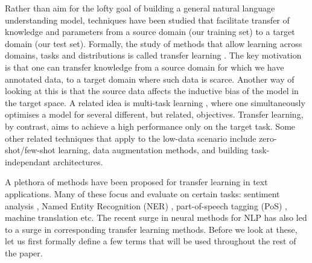 \documentclass[12pt]{report}
\begin{document}
	\par Rather than aim for the lofty goal of building a general natural language understanding model, techniques have been studied that facilitate transfer of knowledge and parameters from a source domain (our training set) to a target domain (our test set). Formally, the study of methods that allow learning across domains, tasks and distributions is called transfer learning \citep{pan2010survey}. The key motivation is that one can transfer knowledge from a source domain for which we have annotated data, to a target domain where such data is scarce. Another way of looking at this is that the source data affects the inductive bias of the model in the target space. A related idea is multi-task learning \citep{collobert2008unified}, where one simultaneously optimises a model for several different, but related, objectives. Transfer learning, by contrast, aims to achieve a high performance only on the target task. Some other related techniques that apply to the low-data scenario include zero-shot/few-shot learning, data augmentation methods, and building task-independant architectures.
	\par A plethora of methods have been proposed for transfer learning in text applications. Many of these focus and evaluate on certain tasks: sentiment analysis \citep{blitzer2007biographies} \citep{glorot2011domain}, Named Entity Recognition (NER) \citep{lee2017transfer}, part-of-speech tagging (PoS) \citep{blitzer2006domain}, machine translation \citep{chu2017empirical} etc. The recent surge in neural methods for NLP has also led to a surge in corresponding transfer learning methods. Before we look at these, let us first formally define a few terms that will be used throughout the rest of the paper. 
\end{document}
